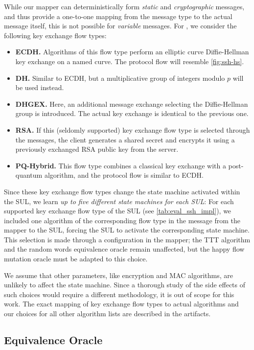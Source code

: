 While our mapper can deterministically form \emph{static} and \emph{cryptographic} messages, and thus provide a one-to-one mapping from the message type to the actual message itself, this is not possible for \emph{variable} messages. For \msgkexinit, we consider the following key exchange flow types:
\begin{itemize}
    \item \textbf{ECDH.} Algorithms of this flow type perform an elliptic curve Diffie-Hellman key exchange on a named curve. The protocol flow will resemble \autoref{fig:ssh-hs}.
    \item \textbf{DH.} Similar to ECDH, but a multiplicative group of integers modulo $p$ will be used instead.
    \item \textbf{DHGEX.} Here, an additional message exchange selecting the Diffie-Hellman group is introduced. The actual key exchange is identical to the previous one.
    \item \textbf{RSA.} If this (seldomly supported) key exchange flow type is selected through the \msgkexinit messages, the client generates a shared secret and encrypts it using a previously exchanged RSA public key from the server.
    \item \textbf{PQ-Hybrid.} This flow type combines a classical key exchange with a post-quantum algorithm, and the protocol flow is similar to ECDH.
\end{itemize}
Since these key exchange flow types change the state machine activated within the SUL, we learn \emph{up to five different state machines for each SUL}: For each supported key exchange flow type of the SUL (see \autoref{tab:eval_ssh_impl}), we included one algorithm of the corresponding flow type in the \msgkexinit message from the mapper to the SUL, forcing the SUL to activate the corresponding state machine. This selection is made through a configuration in the mapper; the TTT algorithm and the random words equivalence oracle remain unaffected, but the happy flow mutation oracle must be adapted to this choice.

We assume that other \msgkexinit parameters, like encryption and MAC algorithms, are unlikely to affect the state machine. Since a thorough study of the side effects of such choices would require a different methodology, it is out of scope for this work. The exact mapping of key exchange flow types to actual algorithms and our choices for all other algorithm lists are described in the artifacts.

\subsection{Equivalence Oracle} 
\label{subsec:eqoracle}

